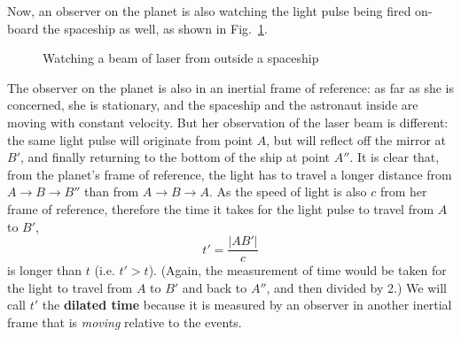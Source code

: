 Now, an observer on the planet is also watching the light pulse being fired
on-board the spaceship as well, as shown in Fig.~\ref{fig:time-dilation2}.
\begin{figure}[ht]
  \centering
  \caption{Watching a beam of laser from outside a spaceship}
  \label{fig:time-dilation2}
\end{figure}
The observer on the planet is also in an inertial frame of reference: as far as
she is concerned, she is stationary, and the spaceship and the astronaut inside
are moving with constant velocity. But her observation of the laser beam is
different: the same light pulse will originate from point $A$, but will reflect
off the mirror at $B'$, and finally returning to the bottom of the ship at
point $A''$. It is clear that, from the planet's frame of reference, the light
has to travel a longer distance from $A\rightarrow B\rightarrow B''$ than from
$A\rightarrow B\rightarrow A$. As the speed of light is also $c$ from her
frame of reference, therefore the time it takes for the light pulse to travel
from $A$ to $B'$,
\begin{equation}
  t'=\frac{|AB'|}c
\end{equation}
is longer than $t$ (i.e. $t'>t$). (Again, the measurement of time would be
taken for the light to travel from $A$ to $B'$ and back to $A''$, and then
divided by 2.) We will call $t'$ the \textbf{dilated time} because it is
measured by an observer in another inertial frame that is \emph{moving}
relative to the events. 

